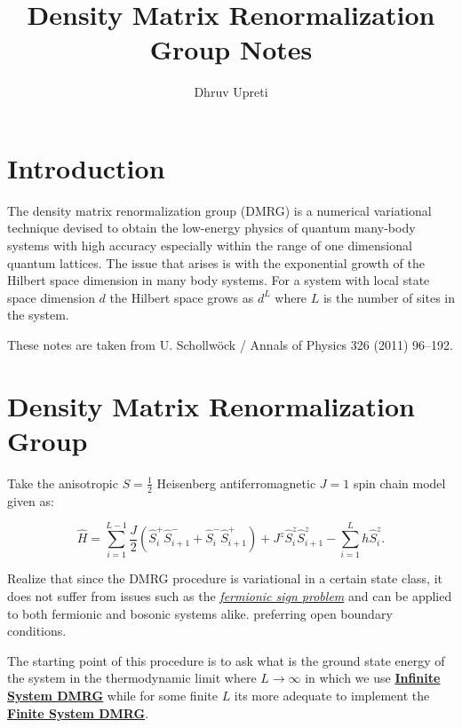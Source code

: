 \documentclass{article}
\begin{document}
\title{Density Matrix Renormalization Group Notes}
\author{Dhruv Upreti}
\maketitle

\thispagestyle{empty}

\section{Introduction}

The density matrix renormalization group (DMRG) is a numerical variational technique devised to obtain the low-energy physics of quantum many-body systems with high accuracy especially within the range of one dimensional quantum lattices. The issue that arises is with the exponential growth of the Hilbert space dimension in many body systems. For a system with local state space dimension $d$ the Hilbert space grows as $d^L$ where $L$ is the number of sites in the system.   

\vspace{1em}

\noindent These notes are taken from U. Schollwöck / Annals of Physics 326 (2011) 96–192. 

\section{Density Matrix Renormalization Group}

\noindent Take the anisotropic $S = \frac 12$ Heisenberg antiferromagnetic $J = 1$ spin chain model given as: 

\[
\hat{H} = \sum_{i=1}^{L-1} \frac{J}{2} \left( \hat{S}_i^+ \hat{S}_{i+1}^- + \hat{S}_i^- \hat{S}_{i+1}^+ \right) + J^z \hat{S}_i^z \hat{S}_{i+1}^z - \sum_{i=1}^{L} h \hat{S}_i^z.
\]

\noindent Realize that since the DMRG procedure is variational in a certain state class, it does not suffer from issues such as the \href{https://en.wikipedia.org/wiki/Numerical_sign_problem}{\emph{fermionic sign problem}} and can be applied to both fermionic and bosonic systems alike. preferring open boundary conditions.

\vspace{1em}

\noindent The starting point of this procedure is to ask what is the ground state energy of the system in the thermodynamic limit where $L \rightarrow \infty$ in which we use \hyperref[subsec:idmrg]{\textbf{Infinite System DMRG}} while for some finite $L$ its more adequate to implement the \hyperref[subsec:idmrg]{\textbf{Finite System DMRG}}. 
\end{document}
